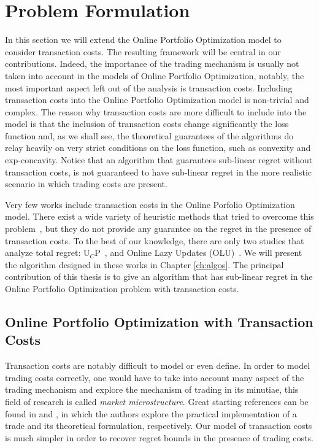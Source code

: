 \chapter{Problem Formulation}\label{ch:transaction_costs}

In this section we will extend the Online Portfolio Optimization model to consider transaction costs. The resulting framework will be central in our contributions.  
Indeed, the importance of the trading mechanism is usually not taken into account in the models of Online Portfolio Optimization, notably, the most important aspect left out of the analysis is transaction costs. Including transaction costs into the Online Portfolio Optimization model is non-trivial and complex. The reason why transaction costs are more difficult to include into the model is that the inclusion of transaction costs change significantly the loss function and, as we shall see, the theoretical guarantees of the algorithms do relay heavily on very strict conditions on the loss function, such as convexity and exp-concavity.
Notice that an algorithm that guarantees sub-linear regret without transaction costs, is not guaranteed to have sub-linear regret in the more realistic scenario in which trading costs are present. 

Very few works include transaction costs in the Online Porfolio Optimization model. 
There exist a wide variety of heuristic methods that tried to overcome this problem~\cite{li2018transaction,yang2018reversion}, but they do not provide any guarantee on the regret in the presence of transaction costs. 
To the best of our knowledge, there are only two studies that analyze total regret: U$_C$P~\cite{blum1999universal}, and Online Lazy Updates (OLU)~\cite{das2013online}. We will present the algorithm designed in these works in Chapter \ref{ch:algos}. The principal contribution of this thesis is to give an algorithm that has sub-linear regret in the Online Portfolio Optimization problem with transaction costs.

\section{Online Portfolio Optimization with Transaction Costs}

Transaction costs are notably difficult to model or even define. In order to model trading costs correctly, one would have to take into account many aspect of the trading mechanism and explore the mechanism of trading in its minutiae, this field of research is called \emph{market microstructure}. Great starting references can be found in \cite{harris2003trading} and \cite{o1997market}, in which the authors explore the practical implementation of a trade and its theoretical formulation, respectively. Our model of transaction costs is much simpler in order to recover regret bounds in the presence of trading costs. 

